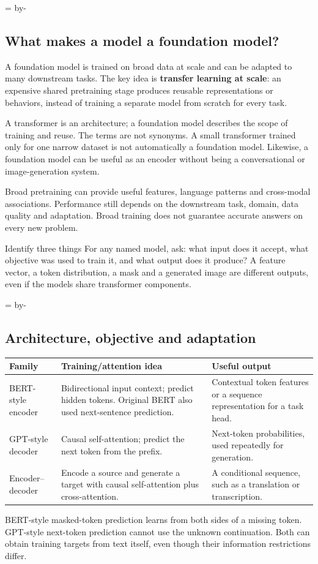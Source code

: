 \documentclass[11pt]{article}
\newcommand{\newsubsection}[1]{\par\begingroup\skip0=\pagegoal\advance\skip0 by-\pagetotal\ifdim\skip0<12\baselineskip\newpage\fi\endgroup\subsection{#1}}
\begin{document}
\newsubsection{What makes a model a foundation model?}
A foundation model is trained on broad data at scale and can be adapted to many downstream tasks. The key idea is \textbf{transfer learning at scale}: an expensive shared pretraining stage produces reusable representations or behaviors, instead of training a separate model from scratch for every task.

A transformer is an architecture; a foundation model describes the scope of training and reuse. The terms are not synonyms. A small transformer trained only for one narrow dataset is not automatically a foundation model. Likewise, a foundation model can be useful as an encoder without being a conversational or image-generation system.

Broad pretraining can provide useful features, language patterns and cross-modal associations. Performance still depends on the downstream task, domain, data quality and adaptation. Broad training does not guarantee accurate answers on every new problem.

\begin{keyidea}{Identify three things}
For any named model, ask: what input does it accept, what objective was used to train it, and what output does it produce? A feature vector, a token distribution, a mask and a generated image are different outputs, even if the models share transformer components.
\end{keyidea}

\newsubsection{Architecture, objective and adaptation}
\begin{longtable}{@{}P{.23\textwidth}P{.33\textwidth}P{.34\textwidth}@{}}
\toprule Family & Training/attention idea & Useful output\\\midrule\endhead
BERT-style encoder & Bidirectional input context; predict hidden tokens. Original BERT also used next-sentence prediction. & Contextual token features or a sequence representation for a task head.\\
GPT-style decoder & Causal self-attention; predict the next token from the prefix. & Next-token probabilities, used repeatedly for generation.\\
Encoder--decoder & Encode a source and generate a target with causal self-attention plus cross-attention. & A conditional sequence, such as a translation or transcription.\\\bottomrule
\end{longtable}
BERT-style masked-token prediction learns from both sides of a missing token. GPT-style next-token prediction cannot use the unknown continuation. Both can obtain training targets from text itself, even though their information restrictions differ.
\end{document}

